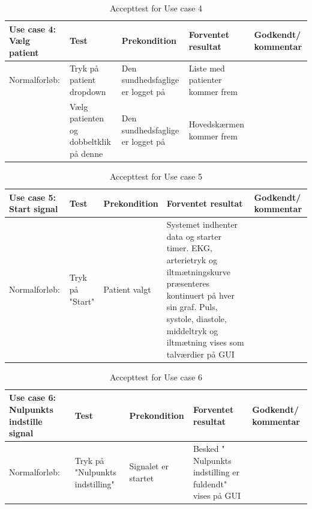 \begin{table}[H]
\caption{Accepttest for Use case 4}\label{tab:tabel8}
\begin{tabular}{|>{\raggedright\arraybackslash}p{2.5cm}| >{\raggedright\arraybackslash}p{2.9cm} | >{\raggedright\arraybackslash}p{2.9cm} | >{\raggedright\arraybackslash}p{2.9cm} | >{\raggedright\arraybackslash}p{2.8cm} |}
   \hline
   \textbf{Use case 4: Vælg patient} &\textbf{Test}& \textbf{Prekondition} & \textbf{Forventet resultat} & \textbf{Godkendt/ kommentar}\\ \hline
   Normalforløb:& Tryk på patient dropdown & Den sundhedsfaglige er logget på & Liste med patienter kommer frem  & \\\hline
   & Vælg patienten og dobbeltklik på denne & Den sundhedsfaglige er logget på & Hovedskærmen kommer frem &\\\hline
\end{tabular}
\end{table}


\begin{table}[H]
\caption{Accepttest for Use case 5}\label{tab:tabel8}
\begin{tabular}{|>{\raggedright\arraybackslash}p{2.5cm}| >{\raggedright\arraybackslash}p{2.9cm} | >{\raggedright\arraybackslash}p{2.9cm} | >{\raggedright\arraybackslash}p{2.9cm} | >{\raggedright\arraybackslash}p{2.8cm} |}
   \hline
   \textbf{Use case 5: Start signal} &\textbf{Test}& \textbf{Prekondition} & \textbf{Forventet resultat} & \textbf{Godkendt/ kommentar}\\ \hline
   Normalforløb:& Tryk på "Start"& Patient valgt & Systemet indhenter data og starter timer. EKG, arterietryk og iltmætningskurve præsenteres kontinuert på hver sin graf. Puls, systole, diastole, middeltryk og iltmætning vises som talværdier på GUI & \\\hline
\end{tabular}
\end{table}

\begin{table}[H]
\caption{Accepttest for Use case 6}\label{tab:tabel8}
\begin{tabular}{|>{\raggedright\arraybackslash}p{2.5cm}| >{\raggedright\arraybackslash}p{2.9cm} | >{\raggedright\arraybackslash}p{2.9cm} | >{\raggedright\arraybackslash}p{2.9cm} | >{\raggedright\arraybackslash}p{2.8cm} |}
   \hline
   \textbf{Use case 6: Nulpunkts indstille signal } &\textbf{Test}& \textbf{Prekondition} & \textbf{Forventet resultat} & \textbf{Godkendt/ kommentar}\\ \hline
   Normalforløb:& Tryk på "Nulpunkts indstilling" & Signalet er startet & Besked " Nulpunkts indstilling er fuldendt" vises på GUI &\\\hline
\end{tabular}
\end{table}


